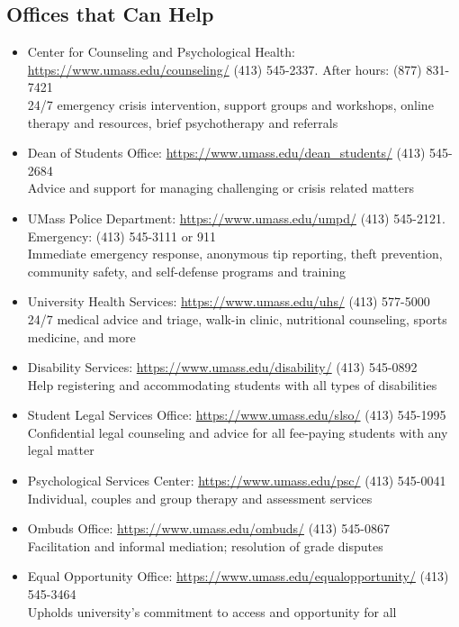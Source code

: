 \documentclass[11pt,twoside]{article}
\numberwithin{equation}{section}
\newcommand{\?}{\stackrel{?}{=}}
\begin{document}
\subsection{Offices that Can Help}
\begin{itemize}
\item  Center for Counseling and Psychological Health: \url{https://www.umass.edu/counseling/} (413) 545-2337.  After hours: (877) 831-7421\\
24/7 emergency crisis intervention, support groups and workshops, online therapy and resources, brief psychotherapy and referrals
   \item  Dean of Students Office: \url{https://www.umass.edu/dean_students/} (413) 545-2684\\
Advice and support for managing challenging or crisis related matters
   \item  UMass Police Department: \url{https://www.umass.edu/umpd/} (413) 545-2121.  Emergency: (413) 545-3111 or 911\\
Immediate emergency response, anonymous tip reporting, theft prevention, community safety, and self-defense programs and training
   \item  University Health Services: \url{https://www.umass.edu/uhs/} (413) 577-5000\\
24/7 medical advice and triage, walk-in clinic, nutritional counseling, sports medicine, and more
   \item  Disability Services: \url{https://www.umass.edu/disability/} (413) 545-0892\\
Help registering and accommodating students with all types of disabilities
   \item  Student Legal Services Office: \url{https://www.umass.edu/slso/} (413) 545-1995\\
Confidential legal counseling and advice for all fee-paying students with any legal matter
   \item  Psychological Services Center: \url{https://www.umass.edu/psc/} (413) 545-0041\\
Individual, couples and group therapy and assessment services
   \item  Ombuds Office: \url{https://www.umass.edu/ombuds/} (413) 545-0867\\
Facilitation and informal mediation; resolution of grade disputes
   \item  Equal Opportunity Office: \url{https://www.umass.edu/equalopportunity/} (413) 545-3464\\
Upholds university’s commitment to access and opportunity for all
\end{itemize}
\end{document}
